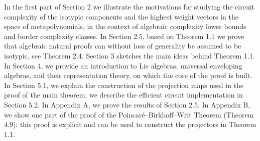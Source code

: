 In the first part of Section 2 we illustrate the motivations for studying the circuit complexity of the isotypic components and the highest weight vectors in the space of metapolynomials, in the context of algebraic complexity lower bounds and border complexity classes.
In Section 2.5, based on Theorem 1.1 we prove that algebraic natural proofs can without loss of generality be assumed to be isotypic, see Theorem 2.4.
Section 3 sketches the main ideas behind Theorem 1.1. In Section 4, we provide an introduction to Lie algebras, universal enveloping algebras, and their representation theory, on which the core of the proof is built. In Section 5.1, we explain the construction of the projection maps used in the proof of the main theorem; we describe the efficient circuit implementation in Section 5.2. In Appendix A, we prove the results of Section 2.5. In Appendix B, we show one part of the proof of the Poincaré–Birkhoff–Witt Theorem (Theorem 4.9); this proof is explicit and can be used to construct the projectors in Theorem 1.1.




